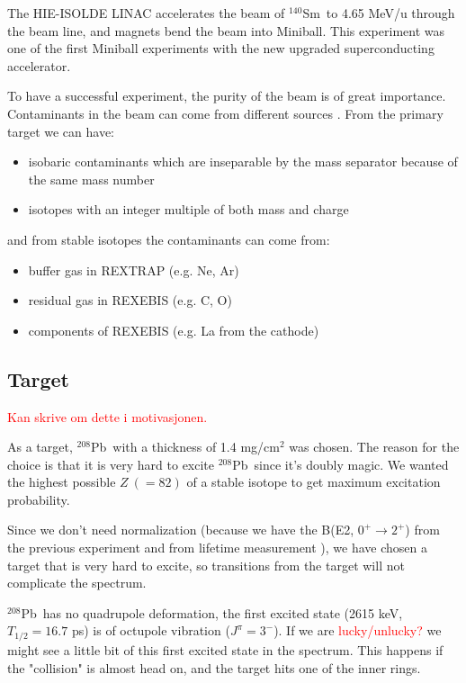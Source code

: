 \documentclass[twoside,english]{uiofysmaster/uiofysmaster}
\newcommand{\Sm}{$^{140}$Sm} %
\newcommand{\Pb}{$^{208}$Pb}
\begin{document}
The HIE-ISOLDE LINAC accelerates the beam of \Sm\ to 4.65 MeV/u through the beam line, and magnets bend the beam into Miniball. This experiment was one of the first Miniball experiments with the new upgraded superconducting accelerator.

To have a successful experiment, the purity of the beam is of great importance. Contaminants in the beam can come from different sources  \cite{MB-spect}. From the primary target we can have:
\begin{itemize}
	\item isobaric contaminants which are inseparable by the mass separator because of the same mass number
	\item isotopes with an integer multiple of both mass and charge
\end{itemize}
and from stable isotopes the contaminants can come from:
\begin{itemize}
	\item buffer gas in REXTRAP (e.g. Ne, Ar)
	\item residual gas in REXEBIS (e.g. C, O)
	\item components of REXEBIS (e.g. La from the cathode)
\end{itemize}


\subsection{Target}
\textcolor{red}{Kan skrive om dette i motivasjonen.}


As a target, \Pb\ with a thickness of 1.4 mg/cm$^2$ was chosen. The reason for the choice is that it is very hard to excite \Pb\ since it's doubly magic. We wanted the highest possible $Z ~(= 82)$ of a stable isotope to get maximum excitation probability. 

Since we don't need normalization (because we have the B(E2, $0^+ \rightarrow 2^+$) from the previous experiment \cite{Klintefjord} and from lifetime measurement \cite{BelloGarrote2015}), we have chosen a target that is very hard to excite, so transitions from the target will not complicate the spectrum.

\Pb\ has no quadrupole deformation, the first excited state (2615 keV, $T_{1/2} = 16.7$ ps) is of octupole vibration ($J^\pi = 3^-$). If we are \textcolor{red}{lucky/unlucky?} we might see a little bit of this first excited state in the spectrum. This happens if the "collision" is almost head on, and the target hits one of the inner rings.
\end{document}
